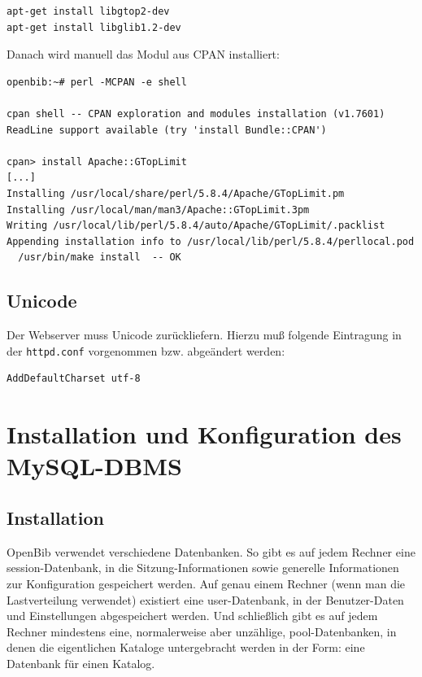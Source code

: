 \documentclass[11pt, twoside, a4paper, BCOR8mm, DIV12, bibtotoc,idxtotoc]{scrbook}
\begin{document}
\begin{verbatim}
apt-get install libgtop2-dev
apt-get install libglib1.2-dev
\end{verbatim}

Danach wird manuell das Modul aus CPAN installiert:

\begin{verbatim}
openbib:~# perl -MCPAN -e shell

cpan shell -- CPAN exploration and modules installation (v1.7601)
ReadLine support available (try 'install Bundle::CPAN')

cpan> install Apache::GTopLimit
[...]
Installing /usr/local/share/perl/5.8.4/Apache/GTopLimit.pm
Installing /usr/local/man/man3/Apache::GTopLimit.3pm
Writing /usr/local/lib/perl/5.8.4/auto/Apache/GTopLimit/.packlist
Appending installation info to /usr/local/lib/perl/5.8.4/perllocal.pod
  /usr/bin/make install  -- OK
\end{verbatim}


\subsection{Unicode}

Der Webserver muss Unicode zurückliefern. Hierzu muß folgende
Eintragung in der \texttt{httpd.conf} vorgenommen bzw. abgeändert
werden:

\begin{verbatim}
AddDefaultCharset utf-8
\end{verbatim}

\section{Installation und Konfiguration des MySQL-DBMS}
\label{sec:instmysql}


\subsection{Installation}

OpenBib verwendet verschiedene Datenbanken. So gibt es auf jedem
Rechner eine session-Datenbank, in die Sitzung-Informationen sowie
generelle Informationen zur Konfiguration gespeichert werden. Auf
genau einem Rechner (wenn man die Lastverteilung verwendet) existiert
eine user-Datenbank, in der Benutzer-Daten und Einstellungen
abgespeichert werden. Und schließlich gibt es auf jedem Rechner
mindestens eine, normalerweise aber unzählige, pool-Datenbanken, in
denen die eigentlichen Kataloge untergebracht werden in der Form: eine
Datenbank für einen Katalog.
\end{document}
